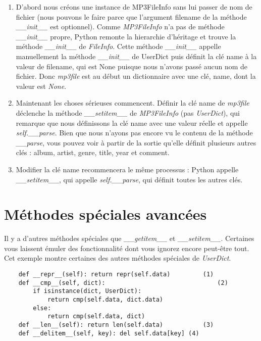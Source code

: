 \begin{enumerate}
    \item D'abord nous créons une instance de MP3FileInfo sans lui passer de nom de fichier (nous pouvons le faire parce que l'argument filename de la méthode \emph{\_\_init\_\_} est optionnel). Comme \emph{MP3FileInfo} n'a pas de méthode \emph{\_\_init\_\_} propre, Python remonte la hierarchie d'héritage et trouve la méthode \emph{\_\_init\_\_} de \emph{FileInfo}. Cette méthode \emph{\_\_init\_\_} appelle manuellement la méthode \emph{\_\_init\_\_} de UserDict puis définit la clé name à la valeur de filename, qui est None puisque nous n'avons passé aucun nom de fichier. Donc \emph{mp3file} est au début un dictionnaire avec une clé, name, dont la valeur est \emph{None}.
    \item Maintenant les choses sérieuses commencent. Définir la clé name de \emph{mp3file} déclenche la méthode \emph{\_\_setitem\_\_} de \emph{MP3FileInfo} (pas \emph{UserDict}), qui remarque que nous définissons la clé name avec une valeur réelle et appelle \emph{self.\_\_parse}. Bien que nous n'ayons pas encore vu le contenu de la méthode \emph{\_\_parse}, vous pouvez voir à partir de la sortie qu'elle définit plusieurs autres clés : album, artist, genre, title, year et comment.
    \item Modifier la clé name recommencera le même processus : Python appelle \emph{\_\_setitem\_\_}, qui appelle \emph{self.\_\_parse}, qui définit toutes les autres clés.
\end{enumerate}

\section{Méthodes spéciales avancées}

Il y a d'autres méthodes spéciales que \emph{\_\_getitem\_\_} et \emph{\_\_setitem\_\_}. Certaines vous laissent émuler des fonctionnalité dont vous ignorez encore peut-être tout. Cet exemple montre certaines des autres méthodes spéciales de \emph{UserDict}.

\begin{example}
\begin{lstlisting}
    def __repr__(self): return repr(self.data)         (1)
    def __cmp__(self, dict):                               (2)
        if isinstance(dict, UserDict):
            return cmp(self.data, dict.data)
        else:
            return cmp(self.data, dict)
    def __len__(self): return len(self.data)           (3)
    def __delitem__(self, key): del self.data[key] (4)
\end{lstlisting}
\end{example}

